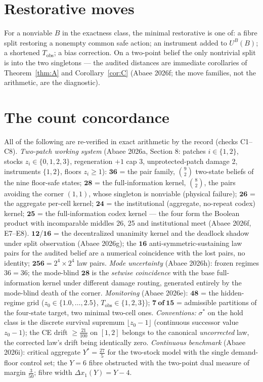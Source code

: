 \documentclass[10pt,twocolumn]{article}
\theoremstyle{definition}
\begin{document}
\section{Restorative moves}

For a nonviable $B$ in the exactness class, the minimal restorative is
one of: a fibre split restoring a nonempty common safe action; an
instrument added to $U^B(B)$; a shortened $T_{\mathrm{obs}}$; a bias
correction. On a two-point belief the only nontrivial split is into the
two singletons --- the audited distances are immediate corollaries of
Theorem~\ref{thm:A} and Corollary~\ref{cor:C} (Abaee 2026f; the move
families, not the arithmetic, are the diagnostic).

\section{The count concordance}

All of the following are re-verified in exact arithmetic by the record
(checks C1--C8). \emph{Two-patch working system} (Abaee 2026a, Section 8:
patches $i \in \{1,2\}$, stocks $z_i \in \{0,1,2,3\}$, regeneration $+1$
cap 3, unprotected-patch damage 2, instruments $\{1,2\}$, floors
$z_i \ge 1$): $\mathbf{36}$ = the pair family, $\binom{9}{2}$ two-state
beliefs of the nine floor-safe states; $\mathbf{28}$ = the
full-information kernel, $\binom{8}{2}$, the pairs avoiding the corner
$(1,1)$, whose singleton is nonviable (physical failure);
$\mathbf{26}$ = the aggregate per-cell kernel; $\mathbf{24}$ = the
institutional (aggregate, no-repeat codex) kernel; $\mathbf{25}$ = the
full-information codex kernel --- the four form the Boolean product with
incomparable middles 26, 25 and institutional meet (Abaee 2026f, E7--E8).
$\mathbf{12}$/$\mathbf{16}$ = the decentralized unanimity kernel and the
deadlock shadow under split observation (Abaee 2026g); the
$\mathbf{16}$ anti-symmetric-sustaining law pairs for the audited belief
are a numerical coincidence with the lost pairs, no identity;
$\mathbf{256} = 2^4 \times 2^4$ law pairs. \emph{Mode uncertainty}
(Abaee 2026h): frozen regimes $36 = 36$; the mode-blind $\mathbf{28}$ is
the \emph{setwise coincidence} with the base full-information kernel
under different damage routing, generated entirely by the mode-blind
death of the corner. \emph{Monitoring} (Abaee 2026e): $\mathbf{48}$ =
the hidden-regime grid ($z_0 \in \{1.0,\dots,2.5\}$, $T_{\mathrm{obs}}
\in \{1,2,3\}$); $\mathbf{7\ of\ 15}$ = admissible partitions of the
four-state target, two minimal two-cell ones.
\emph{Conventions:} $\sigma^{*}$ on the hold class is the discrete
survival supremum $\lfloor z_0 - 1 \rfloor$ (continuous successor value
$z_0 - 1$); the CE drift $\ge \tfrac{21}{100}$ on $[1,2]$ belongs to the
canonical \emph{uncorrected} law, the corrected law's drift being
identically zero. \emph{Continuous benchmark} (Abaee 2026i): critical
aggregate $Y^{*} = \tfrac{27}{5}$ for the two-stock model with the single
demand-floor control set; the $Y = 6$ fibre obstructed with the two-point
dual measure of margin $\tfrac{3}{50}$; fibre width $\Delta x_1(Y) = Y-4$.
\end{document}
